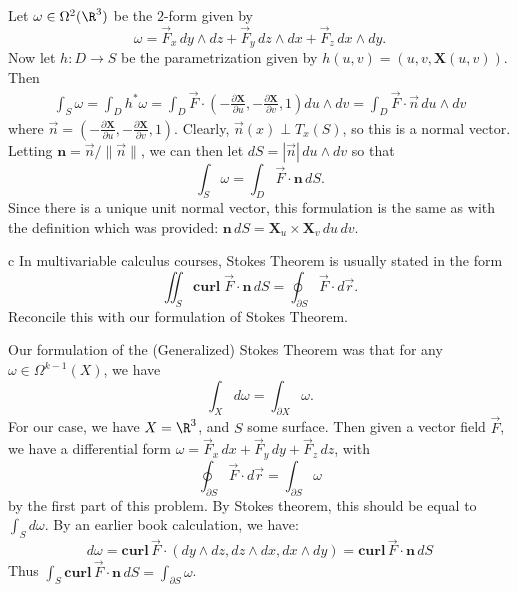 \documentclass[11pt,letterpaper]{article}
\begin{document}
\begin{solution}
    \quad Let $\omega\in \Omega^2(\R^3)$ be the $2$-form given by 
    \[
        \omega = \vec{F}_x\, dy\wedge dz + \vec{F}_y\, dz\wedge dx + \vec{F}_z\, dx\wedge dy
    .\]
    Now let $h : D \to S$ be the parametrization given by $h(u,v)=(u,v,\mathbf{X}(u,v))$. Then
    \[
        \begin{aligned}
            \int_S \omega = \int_D h^*\omega = \int_D \vec{F}\cdot\left(-\frac{\partial \mathbf{X}}{\partial u}, -\frac{\partial \mathbf{X}}{\partial v}, 1\right) du\wedge dv = \int_D \vec{F}\cdot \vec{n}\, du\wedge dv
        \end{aligned}
    \] 
    where $\vec{n}=\left(-\frac{\partial \mathbf{X}}{\partial u}, -\frac{\partial \mathbf{X}}{\partial v}, 1\right)$. Clearly, $\vec{n}(x)\perp T_x(S)$, so this is a normal vector. Letting $\mathbf{n} = \vec{n} / \|\vec{n}\|$, we can then let $dS=|\vec{n}|\, du\wedge dv$ so that
    \[
        \int_S \omega = \int_D \vec{F}\cdot \mathbf{n}\,dS
    .\] 
    Since there is a unique unit normal vector, this formulation is the same as with the definition which was provided: $\mathbf{n}\,dS = \mathbf{X}_u\times \mathbf{X}_v\,du\,dv$.

    \begin{partproblem}{c}
        In multivariable calculus courses, Stokes Theorem is usually stated in the form
        \[
            \iint_{S} \mathbf{curl}\;\vec{F}\cdot \mathbf{n}\,dS = \oint_{\partial S}\vec{F}\cdot d\vec{r}
        .\] 
        Reconcile this with our formulation of Stokes Theorem.
    \end{partproblem}

    \quad Our formulation of the (Generalized) Stokes Theorem was that for any $\omega\in \Omega^{k-1}(X)$, we have
    \[
        \int_X d\omega = \int_{\partial X}\omega
    .\]
    For our case, we have $X=\R^3$, and $S$ some surface. Then given a vector field $\vec{F}$, we have a differential form $\omega = \vec{F}_x\,dx+\vec{F}_y\,dy+\vec{F}_z\,dz$, with \[\oint_{\partial S} \vec{F}\cdot d\vec{r}=\int_{\partial S} \omega\] by the first part of this problem. By Stokes theorem, this should be equal to $\int_S d\omega$. By an earlier book calculation, we have: \[d\omega = \textbf{curl}\, \vec{F}\cdot \left(dy\wedge dz, dz\wedge dx, dx\wedge dy\right) = \textbf{curl}\, \vec{F}\cdot \textbf{n}\,dS\]
    Thus $\int_S \textbf{curl}\, \vec{F}\cdot \textbf{n}\,dS = \int_{\partial S}\omega$.


\end{solution}
\end{document}
